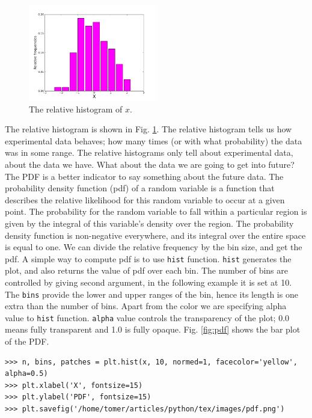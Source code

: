 \documentclass[10pt]{book}
\begin{document}
{\beforefig
\begin{figure}[h!]
  \centering
    \includegraphics[width=0.5\textwidth]{images/relfreq.png}
  \caption{The relative histogram of $x$.}
   \label{fig:rf}
\end{figure}
\afterfig

The relative histogram is shown in Fig. \ref{fig:rf}. The relative histogram tells us how experimental data behaves; how many times (or with what probability) the data was in some range. The relative histograms only tell about experimental data, about the data we have. What about the data we are going to get into future? The PDF is a better indicator to say something about the future data. The probability density function (pdf) of a random variable is a function that describes the relative likelihood for this random variable to occur at a given point. The probability for the random variable to fall within a particular region is given by the integral of this variable’s density over the region. The probability density function is non-negative everywhere, and its integral over the entire space is equal to one. We can divide the relative frequency by the bin size, and get the pdf. A simple way to compute pdf is to use \verb"hist" function. \verb"hist" generates the plot, and also returns the value of pdf over each bin. The number of bins are controlled by giving second argument, in the following example it is set at 10. The \verb"bins" provide the lower and upper ranges of the bin, hence its length is one extra than the number of bins. Apart from the color we are specifying alpha value to \verb"hist" function. \verb"alpha" value controls the transparency of the plot; 0.0 means fully transparent and 1.0 is fully opaque. Fig. \ref{fig:pdf} shows the bar plot of the PDF. 
\beforeverb \begin{verbatim}
>>> n, bins, patches = plt.hist(x, 10, normed=1, facecolor='yellow', alpha=0.5)
>>> plt.xlabel('X', fontsize=15)
>>> plt.ylabel('PDF', fontsize=15)
>>> plt.savefig('/home/tomer/articles/python/tex/images/pdf.png')
\end{verbatim}
\afterverb

}
\end{document}
